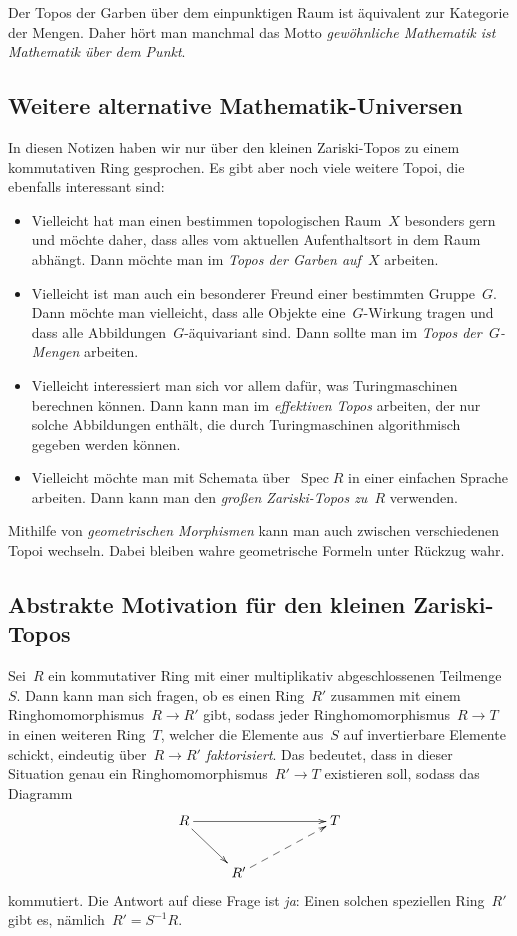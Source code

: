 \documentclass[a4paper,ngerman,12pt]{scrartcl}
\theoremstyle{definition}
\theoremstyle{plain}
\theoremstyle{remark}
\DeclareMathOperator{\Spec}{Spec}
\renewcommand{\_}{\mathpunct{.}\,}
\newcommand{\?}{\,{:}\,}
\begin{document}
Der Topos der Garben über dem einpunktigen Raum ist äquivalent zur Kategorie
der Mengen. Daher hört man manchmal das Motto \emph{gewöhnliche Mathematik ist
Mathematik über dem Punkt}.


\subsection*{Weitere alternative Mathematik-Universen}

In diesen Notizen haben wir nur über den kleinen Zariski-Topos zu einem
kommutativen Ring gesprochen. Es gibt aber noch viele weitere Topoi, die
ebenfalls interessant sind:
\begin{itemize}
\item Vielleicht hat man einen bestimmen topologischen Raum~$X$ besonders gern
und möchte daher, dass alles vom aktuellen Aufenthaltsort
in dem Raum abhängt. Dann möchte man im \emph{Topos der Garben auf~$X$}
arbeiten.
\item Vielleicht ist man auch ein besonderer Freund einer bestimmten
Gruppe~$G$. Dann möchte man vielleicht, dass alle Objekte
eine~$G$-Wirkung tragen und dass alle Abbildungen~$G$-äquivariant
sind. Dann sollte man im \emph{Topos der~$G$-Mengen} arbeiten.
\item Vielleicht interessiert man sich vor allem dafür, was Turingmaschinen
berechnen können. Dann kann man im \emph{effektiven Topos} arbeiten, der nur
solche Abbildungen enthält, die durch Turingmaschinen algorithmisch gegeben
werden können.
\item Vielleicht möchte man mit Schemata über~$\Spec R$ in einer einfachen
Sprache arbeiten. Dann kann man den \emph{großen Zariski-Topos zu~$R$} verwenden.
\end{itemize}

Mithilfe von \emph{geometrischen Morphismen} kann man auch zwischen
verschiedenen Topoi wechseln. Dabei bleiben wahre geometrische Formeln unter
Rückzug wahr.


\subsection*{Abstrakte Motivation für den kleinen Zariski-Topos}

Sei~$R$ ein kommutativer Ring mit einer multiplikativ abgeschlossenen
Teilmenge~$S$. Dann kann man sich fragen, ob es einen Ring~$R'$ zusammen mit einem
Ringhomomorphismus~$R \to R'$ gibt, sodass jeder Ringhomomorphismus~$R \to T$
in einen weiteren Ring~$T$, welcher die Elemente aus~$S$ auf
invertierbare Elemente schickt, eindeutig über~$R \to R'$ \emph{faktorisiert}.
Das bedeutet, dass in dieser Situation genau ein Ringhomomorphismus~$R' \to
T$ existieren soll, sodass das Diagramm
\[ \xymatrix{
  R \ar[rd] \ar[rrr] &&& T \\
  & R' \ar@{-->}[rru]
} \]
kommutiert. Die Antwort auf diese Frage ist \emph{ja}: Einen solchen speziellen
Ring~$R'$ gibt es, nämlich~$R' = S^{-1}R$.
\end{document}
